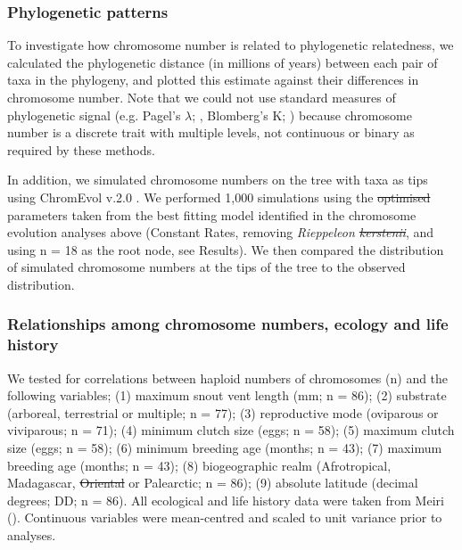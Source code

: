 \documentclass[a4paper, 12pt]{article}
\providecommand{\DIFadd}[1]{{\protect\color{blue}\uwave{#1}}} %
\providecommand{\DIFdel}[1]{{\protect\color{red}\sout{#1}}}                      %
\providecommand{\DIFaddbegin}{} %
\providecommand{\DIFaddend}{} %
\providecommand{\DIFdelbegin}{} %
\providecommand{\DIFdelend}{} %
\newcommand{\DIFscaledelfig}{0.5}
\newlength{\DIFdelgraphicswidth} %
\newlength{\DIFdelgraphicsheight} %
\newcommand{\DIFaddincludegraphics}[2][]{{\color{blue}\fbox{\DIFOincludegraphics[#1]{#2}}}} %
\newcommand{\DIFdelincludegraphics}[2][]{%
\sbox{\DIFdelgraphicsbox}{\DIFOincludegraphics[#1]{#2}}%
\settoboxwidth{\DIFdelgraphicswidth}{\DIFdelgraphicsbox} %
\settoboxtotalheight{\DIFdelgraphicsheight}{\DIFdelgraphicsbox} %
\scalebox{\DIFscaledelfig}{%
\parbox[b]{\DIFdelgraphicswidth}{\usebox{\DIFdelgraphicsbox}\\[-\baselineskip] \rule{\DIFdelgraphicswidth}{0em}}\llap{\resizebox{\DIFdelgraphicswidth}{\DIFdelgraphicsheight}{%
\setlength{\unitlength}{\DIFdelgraphicswidth}%
\begin{picture}(1,1)%
\thicklines\linethickness{2pt} %
{\color[rgb]{1,0,0}\put(0,0){\framebox(1,1){}}}%
{\color[rgb]{1,0,0}\put(0,0){\line( 1,1){1}}}%
{\color[rgb]{1,0,0}\put(0,1){\line(1,-1){1}}}%
\end{picture}%
}\hspace*{3pt}}} %
} %
\DeclareRobustCommand{\DIFaddbegin}{\DIFOaddbegin \let\includegraphics\DIFaddincludegraphics} %
\DeclareRobustCommand{\DIFaddend}{\DIFOaddend \let\includegraphics\DIFOincludegraphics} %
\DeclareRobustCommand{\DIFdelbegin}{\DIFOdelbegin \let\includegraphics\DIFdelincludegraphics} %
\DeclareRobustCommand{\DIFdelend}{\DIFOaddend \let\includegraphics\DIFOincludegraphics} %
\begin{document}
\subsubsection{Phylogenetic patterns}
To investigate how chromosome number is related to phylogenetic relatedness, we calculated the phylogenetic distance (in millions of years) between each pair of taxa in the phylogeny, and plotted this estimate against their differences in chromosome number. 
Note that we could not use standard measures of phylogenetic signal (e.g. Pagel's $\lambda$; \citealt{pagel1999inferring}, Blomberg's K; \citealt{blomberg2003testing}) because chromosome number is a discrete trait with multiple levels, not continuous or binary as required by these methods. 

In addition, we simulated chromosome numbers on the tree with taxa as tips using ChromEvol v.2.0 \citep{glick2014chromevol,mayrose2010probabilistic}. 
We performed 1,000 simulations using the \DIFdelbegin \DIFdel{optimised }\DIFdelend \DIFaddbegin \DIFadd{optimized }\DIFaddend parameters taken from the best fitting model identified in the chromosome evolution analyses above (Constant Rates, removing \textit{Rieppeleon \DIFdelbegin \DIFdel{kerstenii}\DIFdelend \DIFaddbegin \DIFadd{brevicaudatus}\DIFaddend }, and using n = 18 as the root node, see Results). 
We then compared the distribution of simulated chromosome numbers at the tips of the tree to the observed distribution. 

\subsubsection{Relationships among chromosome numbers, ecology and life history}
We tested for correlations between haploid numbers of chromosomes (n) and the following variables; (1) maximum snout vent length (mm; n = 86); (2) substrate (arboreal, terrestrial or multiple; n = 77); (3) reproductive mode (oviparous or viviparous; n = 71); (4) minimum clutch size (eggs; n = 58); (5) maximum clutch size (eggs; n = 58); (6) minimum breeding age (months; n = 43); (7) maximum breeding age (months; n = 43); (8) biogeographic realm (Afrotropical, Madagascar, \DIFdelbegin \DIFdel{Oriental }\DIFdelend \DIFaddbegin \DIFadd{Indomalayan }\DIFaddend or Palearctic; n = 86); (9) absolute latitude (decimal degrees; DD; n = 86). 
All ecological and life history data were taken from Meiri (\citeyear{meiri2018traits}). 
Continuous variables were mean-centred and scaled to unit variance prior to analyses.
\end{document}
